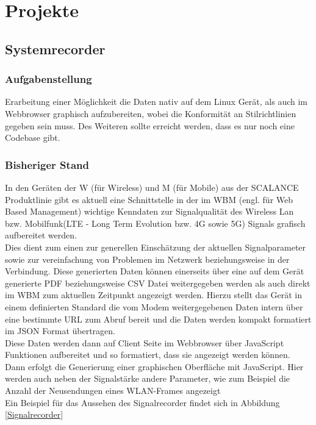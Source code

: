 \chapter{Projekte}

\section{Systemrecorder}
\subsection{Aufgabenstellung}
Erarbeitung einer Möglichkeit die Daten nativ auf dem Linux Gerät, als auch im Webbrowser graphisch aufzubereiten, wobei die Konformität an Stilrichtlinien gegeben sein muss.
Des Weiteren sollte erreicht werden, dass es nur noch eine Codebase gibt. 
\subsection{Bisheriger Stand}
In den Geräten der W (für Wireless) und M (für Mobile) aus der SCALANCE Produktlinie gibt es aktuell eine Schnittstelle in der im WBM (engl. für Web Based Management) wichtige Kenndaten zur Signalqualität des Wireless Lan bzw. Mobilfunk(LTE - Long Term Evolution bzw. 4G sowie 5G) Signals grafisch aufbereitet werden. \\
Dies dient zum einen zur generellen Einschätzung der aktuellen Signalparameter sowie zur vereinfachung von Problemen im Netzwerk beziehungsweise in der Verbindung. Diese generierten Daten 
können einerseits über eine auf dem Gerät generierte PDF beziehungsweise CSV Datei weitergegeben werden als auch direkt im WBM zum aktuellen Zeitpunkt angezeigt werden. Hierzu stellt das Gerät 
in einem definierten Standard die vom Modem weitergegebenen Daten intern über eine bestimmte URL zum Abruf bereit und die Daten werden kompakt formatiert im JSON Format übertragen. \\
Diese Daten werden dann auf Client Seite im Webbrowser über JavaScript Funktionen aufbereitet und so formatiert, dass sie angezeigt werden können. Dann erfolgt die Generierung einer graphischen Oberfläche
mit JavaScript. Hier werden auch neben der Signalstärke andere Parameter, wie zum Beispiel die Anzahl der Neusendungen eines WLAN-Frames angezeigt\\
Ein Beispiel für das Aussehen des Signalrecorder findet sich in Abbildung \ref*{Signalrecorder}

